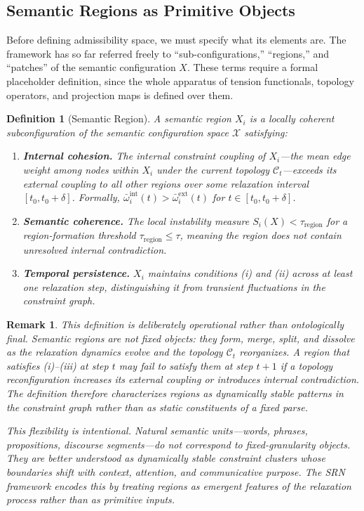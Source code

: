 \documentclass[11pt, a4paper]{article}
\theoremstyle{srn}
\newtheorem{definition}{Definition}[section]
\theoremstyle{srnremark}
\newtheorem{remark}{Remark}[section]
\newcommand{\Cstruct}{\mathcal{C}}           %
\begin{document}
\subsection{Semantic Regions as Primitive Objects}

Before defining admissibility space, we must specify what its elements
are.
The framework has so far referred freely to ``sub-configurations,''
``regions,'' and ``patches'' of the semantic configuration $X$.
These terms require a formal placeholder definition, since the whole
apparatus of tension functionals, topology operators, and projection
maps is defined over them.

\begin{definition}[Semantic Region]
\label{def:region}
A \emph{semantic region} $X_i$ is a locally coherent subconfiguration
of the semantic configuration space $\mathcal{X}$ satisfying:
\begin{enumerate}
  \item[(i)] \textbf{Internal cohesion.}
    The internal constraint coupling of $X_i$---the mean edge weight
    among nodes within $X_i$ under the current topology
    $\Cstruct_t$---exceeds its external coupling to all other regions
    over some relaxation interval $[t_0, t_0 + \delta]$.
    Formally, $\bar{\omega}^{\mathrm{int}}_i(t) > \bar{\omega}^{\mathrm{ext}}_i(t)$
    for $t \in [t_0, t_0 + \delta]$.
  \item[(ii)] \textbf{Semantic coherence.}
    The local instability measure $S_i(X) < \tau_{\mathrm{region}}$
    for a region-formation threshold $\tau_{\mathrm{region}} \leq \tau$,
    meaning the region does not contain unresolved internal contradiction.
  \item[(iii)] \textbf{Temporal persistence.}
    $X_i$ maintains conditions (i) and (ii) across at least one
    relaxation step, distinguishing it from transient fluctuations in
    the constraint graph.
\end{enumerate}
\end{definition}

\begin{remark}
This definition is deliberately operational rather than ontologically
final.
Semantic regions are not fixed objects: they form, merge, split, and
dissolve as the relaxation dynamics evolve and the topology
$\Cstruct_t$ reorganizes.
A region that satisfies (i)--(iii) at step $t$ may fail to satisfy
them at step $t+1$ if a topology reconfiguration increases its
external coupling or introduces internal contradiction.
The definition therefore characterizes regions as \emph{dynamically
stable patterns} in the constraint graph rather than as static
constituents of a fixed parse.

This flexibility is intentional.
Natural semantic units---words, phrases, propositions, discourse
segments---do not correspond to fixed-granularity objects.
They are better understood as dynamically stable constraint clusters
whose boundaries shift with context, attention, and communicative
purpose.
The SRN framework encodes this by treating regions as emergent
features of the relaxation process rather than as primitive inputs.
\end{remark}
\end{document}
